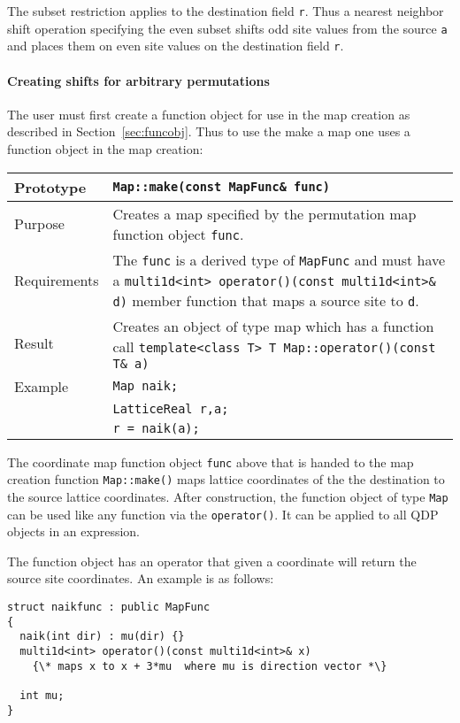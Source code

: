 \documentclass[12pt,letterpaper]{article}
\begin{document}
The subset restriction applies to the destination field {\tt r}.  Thus
a nearest neighbor shift operation specifying the even subset shifts
odd site values from the source {\tt a} and places them on even site
values on the destination field {\tt r}.

\paragraph{Creating shifts for arbitrary permutations}

The user must first create a function object for use in the
map creation as described in Section~\ref{sec:funcobj}. 
Thus to use the make a map one uses a function object in the map
creation:

\begin{flushleft}
\begin{tabular}{|l|p{4.0in}|}
\hline
Prototype    & \verb|Map::make(const MapFunc& func)|\\
\hline
Purpose      & Creates a map specified by the permutation map function 
               object {\tt func}. \\
\hline
Requirements & The \verb|func| is a derived type of \verb|MapFunc| and must
               have a \verb|multi1d<int> operator()(const multi1d<int>& d)| 
               member function that maps a source site to \verb|d|. \\
\hline
Result       & Creates an object of type map which has a function call 
               \verb|template<class T> T Map::operator()(const T& a)| \\
\hline
Example      & \verb|Map naik;|\\
             & \verb|LatticeReal r,a;| \\
             & \verb|r = naik(a);| \\
\hline
  \end{tabular}
\end{flushleft}
%
The coordinate
map function object {\tt func} above that is handed to the
map creation function \verb|Map::make()| maps lattice coordinates
of the the destination to the source lattice coordinates.
After construction, the function object of type \verb|Map| can be
used like any function via the \verb|operator()|. It can be applied
to all QDP objects in an expression.

The function object has an operator that given
a coordinate will return the source site coordinates. An example
is as follows:
\begin{verbatim}
struct naikfunc : public MapFunc
{
  naik(int dir) : mu(dir) {}
  multi1d<int> operator()(const multi1d<int>& x)
    {\* maps x to x + 3*mu  where mu is direction vector *\}

  int mu;
}
\end{verbatim}
%
\end{document}
